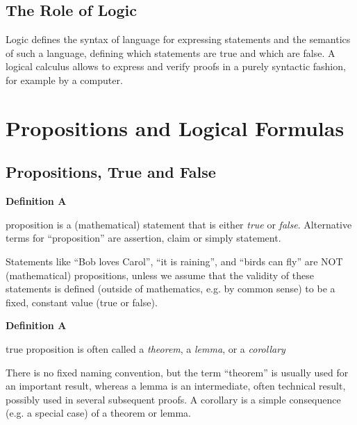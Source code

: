 \documentclass[a4paper]{report}
\newenvironment{definition}[1]{\begin{framed}\centerline{\textbf{Definition #1}}\noindent\hspace{-1.1mm}}{\end{framed}}
\begin{document}
\subsection{The Role of Logic}
Logic defines the syntax of language for expressing statements and the semantics of such a language, defining which statements are true and which are false. A logical calculus allows to express and verify proofs in a purely syntactic fashion, for example by a computer. 
\section{Propositions and Logical Formulas}
\subsection{Propositions, True and False}
\begin{definition}{2.2}
A proposition is a (mathematical) statement that is either \emph{true} or \emph{false}. Alternative terms for ``proposition'' are assertion, claim or simply statement. 
\end{definition}
Statements like ``Bob loves Carol'', ``it is raining'', and ``birds can fly'' are NOT (mathematical) propositions, unless we assume that the validity of these statements is defined (outside of mathematics, e.g. by common sense) to be a fixed, constant value (true or false).

\begin{definition}{2.3}
A true proposition is often called a \emph{theorem}, a \emph{lemma}, or a \emph{corollary}
\end{definition}
There is no fixed naming convention, but the term ``theorem'' is usually used for an important result, whereas a lemma is an intermediate, often technical result, possibly used in several subsequent proofs. A corollary is a simple consequence (e.g. a special case) of a theorem or lemma.
\end{document}

